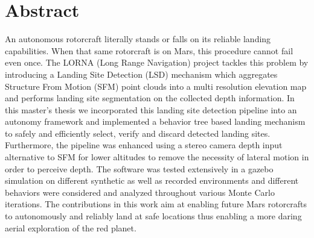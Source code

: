 \chapter*{Abstract}

An autonomous rotorcraft literally stands or falls on its reliable landing capabilities. When that same rotorcraft is on Mars, this procedure cannot fail even once. The LORNA (Long Range Navigation) project tackles this problem by introducing a Landing Site Detection (LSD) mechanism which aggregates Structure From Motion (SFM) point clouds into a multi resolution elevation map and performs landing site segmentation on the collected depth information. In this master's thesis we incorporated this landing site detection pipeline into an autonomy framework and implemented a behavior tree based landing mechanism to safely and efficiently select, verify and discard detected landing sites. Furthermore, the pipeline was enhanced using a stereo camera depth input alternative to SFM for lower altitudes to remove the necessity of lateral motion in order to perceive depth. The software was tested extensively in a gazebo simulation on different synthetic as well as recorded environments and different behaviors were considered and analyzed throughout various Monte Carlo iterations. The contributions in this work aim at enabling future Mars rotorcrafts to autonomously and reliably land at safe locations thus enabling a more daring aerial exploration of the red planet.